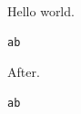 \documentclass{article}
\begin{document}
Hello world.
\begin{lstlisting}
ab
\end{lstlisting}
After.

\begin{lstlisting}[caption={Cap}]
ab
\end{lstlisting}
\end{document}
